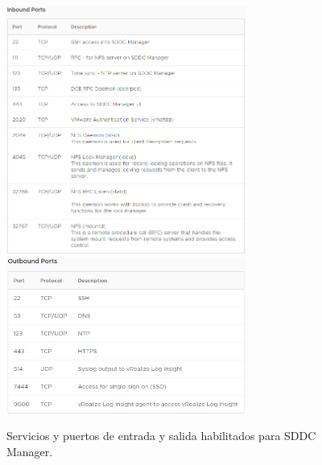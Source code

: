 \begin{figure}[h!]
  \centering
  \includegraphics[width=0.7\textwidth]{imaxes/conceptosPrevios/puertosentradaSDDC.png}
  \includegraphics[width=0.7\textwidth]{imaxes/conceptosPrevios/puertossalidaSDDC.png}
  \caption{Servicios y puertos de entrada y salida habilitados para SDDC Manager.}
  \label{fig:puertosSDDC}
\end{figure}


